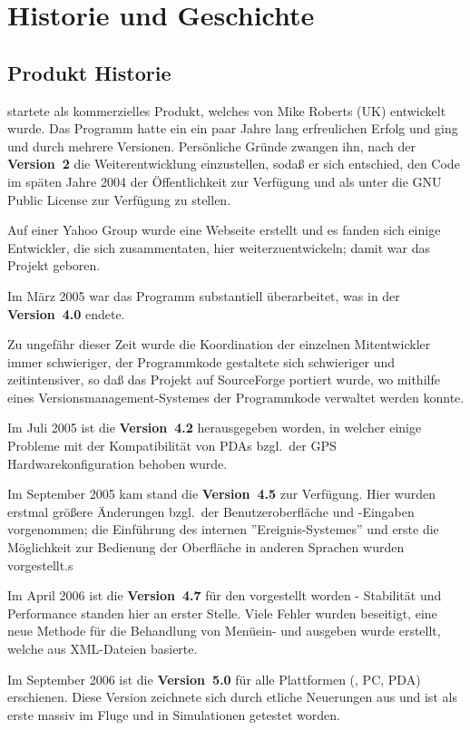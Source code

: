 \chapter{Historie und Geschichte}\label{cha:history-development}
\section{Produkt Historie}

\xc startete als kommerzielles Produkt, welches von Mike Roberts (UK) entwickelt wurde. 
Das Programm hatte ein ein paar Jahre lang erfreulichen Erfolg und ging und durch mehrere Versionen.
Persönliche Gründe zwangen ihn, nach der  {\bf Version~2} die Weiterentwicklung einzustellen, sodaß
er sich entschied, den Code im späten Jahre 2004 der Öffentlichkeit zur Verfügung und  als
 unter die  GNU Public License  zur Verfügung zu stellen.

Auf einer Yahoo Group wurde eine Webseite erstellt und es fanden sich einige Entwickler, die sich zusammentaten,
hier weiterzuentwickeln; damit war das Projekt geboren.

Im März 2005 war das Programm substantiell überarbeitet, was in der {\bf Version~4.0} endete.

Zu ungefähr dieser Zeit wurde die Koordination der einzelnen Mitentwickler immer schwieriger, der Programmkode gestaltete sich
schwieriger und zeitintensiver, so daß das Projekt auf SourceForge portiert wurde, wo mithilfe eines Versionsmanagement-Systemes
der Programmkode  verwaltet werden konnte.

Im Juli 2005 ist die  {\bf Version~4.2} herausgegeben worden, in welcher einige Probleme mit der Kompatibilität von PDAs bzgl.\
der GPS Hardwarekonfiguration behoben wurde.

Im September 2005 kam stand die {\bf Version~4.5} zur Verfügung. Hier wurden erstmal größere Änderungen bzgl.\ der Benutzeroberfläche
und -Eingaben vorgenommen; die Einführung  des internen ''Ereignis-Systemes'' und erste die Möglichkeit zur Bedienung der 
Oberfläche in anderen Sprachen   wurden vorgestellt.s

Im April 2006 ist die {\bf Version~4.7} für den \al vorgestellt worden - Stabilität und Performance standen hier an erster Stelle.
Viele Fehler wurden beseitigt, eine neue Methode für die Behandlung von Menüein- und ausgeben wurde erstellt,
welche aus XML-Dateien basierte.

Im September 2006 ist die  {\bf Version~5.0} für alle Plattformen (\al, PC, PDA) erschienen.
Diese Version zeichnete sich durch etliche Neuerungen aus und ist als erste massiv im Fluge und in 
Simulationen getestet  worden.

